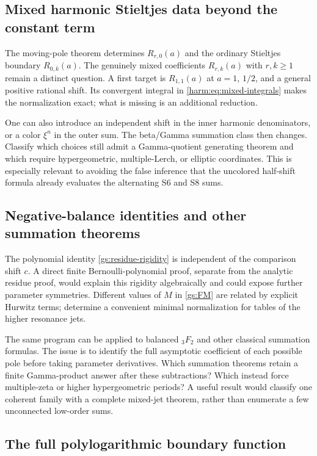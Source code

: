 \subsection{Mixed harmonic Stieltjes data beyond the constant term}

The moving-pole theorem determines $R_{r,0}(a)$ and the ordinary
Stieltjes boundary $R_{0,k}(a)$.  The genuinely mixed coefficients
$R_{r,k}(a)$ with $r,k\ge1$ remain a distinct question.  A first target
is $R_{1,1}(a)$ at $a=1$, $1/2$, and a general positive rational shift.
Its convergent integral in \eqref{harm:eq:mixed-integrals} makes the
normalization exact; what is missing is an additional reduction.

One can also introduce an independent shift in the inner harmonic
denominators, or a color $\xi^n$ in the outer sum.  The beta/Gamma
summation class then changes.  Classify which choices still admit a
Gamma-quotient generating theorem and which require hypergeometric,
multiple-Lerch, or elliptic coordinates.  This is especially relevant
to avoiding the false inference that the uncolored half-shift formula
already evaluates the alternating S6 and S8 sums.

\subsection{Negative-balance identities and other summation theorems}

The polynomial identity \eqref{gs:residue-rigidity} is independent of
the comparison shift $c$.  A direct finite Bernoulli-polynomial proof,
separate from the analytic residue proof, would explain this rigidity
algebraically and could expose further parameter symmetries.
Different values of $M$ in \eqref{gs:FM} are related by explicit
Hurwitz terms; determine a convenient minimal normalization for tables
of the higher resonance jets.

The same program can be applied to balanced ${}_3F_2$ and other classical
summation formulas.  The issue is to identify the full asymptotic
coefficient of each possible pole before taking parameter derivatives.
Which summation theorems retain a finite Gamma-product answer after
these subtractions?  Which instead force multiple-zeta or higher
hypergeometric periods?  A useful result would classify one coherent
family with a complete mixed-jet theorem, rather than enumerate a few
unconnected low-order sums.

\subsection{The full polylogarithmic boundary function}

